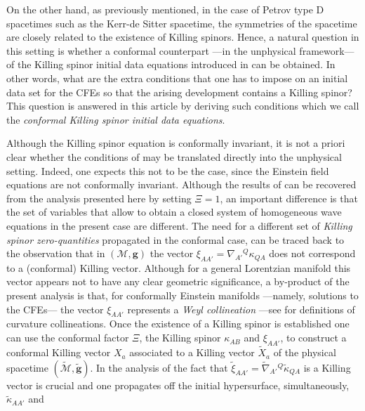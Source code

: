 \documentclass[10pt,a4paper]{article}
\theoremstyle{plain}
\def\bmg{{\bm g}}
\begin{document}
\medskip

On the other hand, as previously mentioned, in the case of Petrov type
D spacetimes such as the Kerr-de Sitter spacetime, the symmetries of
the spacetime are closely related to the existence of Killing spinors.
Hence, a natural question in this setting is whether a conformal
counterpart ---in the unphysical framework--- of the Killing spinor
initial data equations introduced in \cite{GarVal08c} can be
obtained. In other words, what are the extra conditions that one has
to impose on an initial data set for the CFEs so that the arising
development contains a Killing spinor?  This question is answered in
this article by deriving such conditions which we call the
\emph{conformal Killing spinor initial data equations}.

\medskip

Although the Killing spinor equation is conformally invariant, it is
not a priori clear whether the conditions of \cite{GarVal08c,
  BaeVal10b} may be translated directly into the unphysical setting.
Indeed, one expects this not to be the case, since the Einstein field
equations are not conformally invariant.  Although the results of
\cite{GarVal08c} can be recovered from the analysis presented here by
setting $\Xi = 1$, an important difference is that the set of
variables that allow to obtain a closed system of homogeneous wave
equations in the present case are different. The need for a different
set of \emph{Killing spinor zero-quantities} propagated in the
conformal case, can be traced back to the observation that in
$(\mathcal{M},\bmg)$ the vector
$\xi_{AA'}=\nabla_{A'}{}^{Q}\kappa_{QA}$ does not correspond to a
(conformal) Killing vector. Although for a general Lorentzian manifold
this vector appears not to have any clear geometric significance, a
by-product of the present analysis is that, for conformally Einstein
manifolds ---namely, solutions to the CFEs---
the vector $\xi_{AA'}$ represents a \emph{Weyl
collineation} ---see \cite{KatLevDav69} for definitions of curvature
collineations.  Once the existence of a Killing spinor is established
one can use the conformal factor $\Xi$, the Killing spinor
$\kappa_{AB}$ and $\xi_{AA'}$, to construct a conformal Killing vector
$X_{a}$ associated to a Killing vector $\tilde{X}_{a}$ of the physical
spacetime $(\tilde{\mathcal{M}},\tilde{\bmg})$. In the analysis of
\cite{GarVal08c} the fact that
$\tilde{\xi}_{AA'}=\tilde{\nabla}_{A'}{}^{Q}\tilde{\kappa}_{QA}$ is a
Killing vector is crucial and one propagates off the initial
hypersurface, simultaneously, $\tilde{\kappa}_{AA'}$ and
\end{document}
